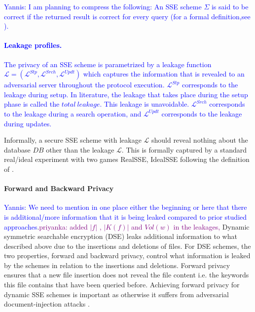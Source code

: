 \documentclass[sigconf]{acmart}
\newcommand{\yannis}[1]{\textcolor{blue}{Yannis: #1}}
\newcommand{\priyanka}[1]{\textcolor{purple}{priyanka: #1}}
\newcommand{\vol}[1]{\lvert{#1}\rvert}
\begin{document}
\yannis{I am planning to compress the following:
An SSE scheme $\Sigma$ is said to be correct if the returned result is correct for every query (for a formal definition,see \cite{PiBas}).
\paragraph{Leakage profiles.} The privacy of an SSE scheme is parametrized by a leakage function $\mathcal{L} = (\mathcal{L}^{Stp}, \mathcal{L}^{Srch}, \mathcal{L}^{Updt})$ which captures the information that is revealed to an adversarial server throughout the protocol execution. $\mathcal{L}^{Stp}$ corresponds to the leakage during setup. In literature, the leakage that takes place during the setup phase is called the $total~leakage$. This leakage is unavoidable. $\mathcal{L}^{Srch}$ corresponds to the leakage during a search operation, and $\mathcal{L}^{Updt}$ corresponds to the leakage during updates.}

Informally, a secure SSE scheme with leakage $\mathcal{L}$ should reveal nothing about the database $DB$ other than the leakage $\mathcal{L}$. This is formally captured by a standard real/ideal experiment with two games RealSSE, IdealSSE following the definition of \cite{ShiNDSS14}.


\paragraph{Forward and Backward Privacy} \yannis{We need to mention in one place either the beginning or here that there is additional/more information that it is being leaked compared to prior studied approaches}.\priyanka{added $\vol{f}$ , $\vol{K(f)}$ and $Vol(w)$ in the leakages,}
Dynamic symmetric searchable encryption (DSE) leaks additional information to what described above due to the insertions and deletions of files. For DSE schemes, the two properties, forward and backward privacy, control what information is leaked by the schemes in relation to the insertions and deletions. Forward privacy ensures that a new file insertion does not reveal the file content i.e. the keywords this file contains that have been queried before.
Achieving forward privacy for dynamic SSE schemes is important as otherwise it suffers from adversarial document-injection attacks \cite{Seal}.
\end{document}
